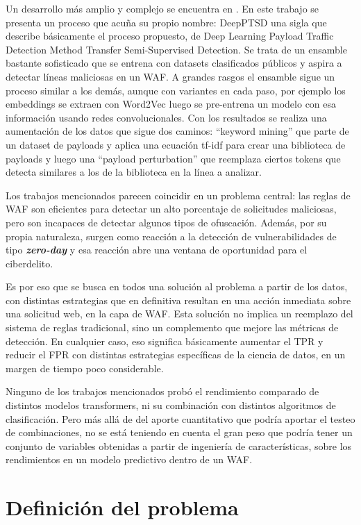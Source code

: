 \documentclass[12pt, a4paper]{article}
\begin{document}
Un desarrollo más amplio y complejo se encuentra en \cite{chen2021payload}. En este trabajo se presenta un proceso que acuña su propio nombre: DeepPTSD una sigla que describe básicamente el proceso propuesto, de Deep Learning Payload Traffic Detection Method Transfer Semi-Supervised Detection. Se trata de un ensamble bastante sofisticado que se entrena con datasets clasificados públicos y aspira a detectar líneas maliciosas en un WAF. A grandes rasgos el ensamble sigue un proceso similar a los demás, aunque con variantes en cada paso, por ejemplo los embeddings se extraen con Word2Vec luego se pre-entrena un modelo con esa información usando redes convolucionales. Con los resultados se realiza una aumentación de los datos que sigue dos caminos: \enquote{keyword mining} que parte de un dataset de payloads y aplica una ecuación tf-idf para crear una biblioteca de payloads y luego una \enquote{payload perturbation} que reemplaza ciertos tokens que detecta similares a los de la biblioteca en la línea a analizar.

Los trabajos mencionados parecen coincidir en un problema central: las reglas de WAF son eficientes para detectar un alto porcentaje de solicitudes maliciosas, pero son incapaces de detectar algunos tipos de ofuscación. Además, por su propia naturaleza, surgen como reacción a la detección de vulnerabilidades de tipo \textbf{\textit{zero-day}} y esa reacción abre una ventana de oportunidad para el ciberdelito.

Es por eso que se busca en todos una solución al problema a partir de los datos, con distintas estrategias que en definitiva resultan en una acción inmediata sobre una solicitud web, en la capa de WAF. Esta solución no implica un reemplazo del sistema de reglas tradicional, sino un complemento que mejore las métricas de detección. En cualquier caso, eso significa básicamente aumentar el TPR y reducir el FPR con distintas estrategias específicas de la ciencia de datos, en un margen de tiempo poco considerable.

Ninguno de los trabajos mencionados probó el rendimiento comparado de distintos modelos transformers, ni su combinación con distintos algoritmos de clasificación. Pero más allá de del aporte cuantitativo que podría aportar el testeo de combinaciones, no se está teniendo en cuenta el gran peso que podría tener un conjunto de variables obtenidas a partir de ingeniería de características, sobre los rendimientos en un modelo predictivo dentro de un WAF.


\section{Definición del problema}
\end{document}
